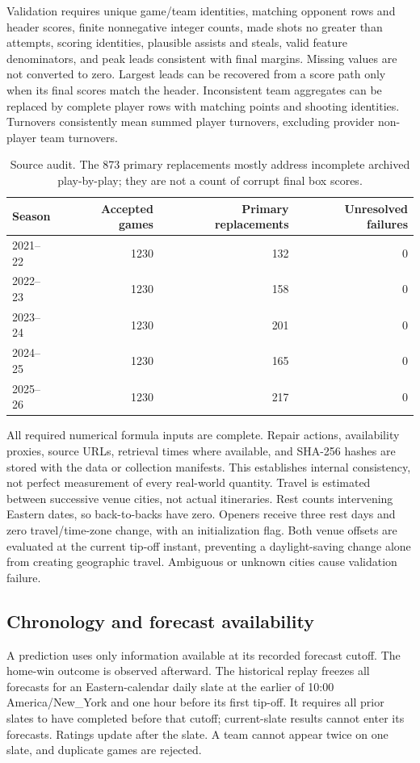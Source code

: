 \documentclass[11pt]{article}
\begin{document}
Validation requires unique game/team identities, matching opponent rows and
header scores, finite nonnegative integer counts, made shots no greater than
attempts, scoring identities, plausible assists and steals, valid feature
denominators, and peak leads consistent with final margins. Missing values
are not converted to zero. Largest leads can be recovered from a score path
only when its final scores match the header. Inconsistent team aggregates
can be replaced by complete player rows with matching points and shooting
identities. Turnovers consistently mean summed player turnovers, excluding
provider non-player team turnovers. 

\begin{table}[ht]
\centering\small
\begin{tabular}{lrrr}
\toprule
Season & Accepted games & Primary replacements & Unresolved failures\\
\midrule
2021--22 & 1230 & 132 & 0\\
2022--23 & 1230 & 158 & 0\\
2023--24 & 1230 & 201 & 0\\
2024--25 & 1230 & 165 & 0\\
2025--26 & 1230 & 217 & 0\\
\bottomrule
\end{tabular}
\caption{Source audit. The 873 primary replacements mostly address incomplete
archived play-by-play; they are not a count of corrupt final box scores.}
\end{table}

All required numerical formula inputs are complete. Repair actions, availability
proxies, source URLs, retrieval times where available, and SHA-256 hashes are
stored with the data or collection manifests. This establishes internal
consistency, not perfect measurement of every real-world quantity. Travel is
estimated between successive venue cities, not actual itineraries. Rest counts
intervening Eastern dates, so back-to-backs have zero. Openers receive three
rest days and zero travel/time-zone change, with an initialization flag.
Both venue offsets are evaluated at the current tip-off instant, preventing
a daylight-saving change alone from creating geographic travel. Ambiguous
or unknown cities cause validation failure.

\subsection{Chronology and forecast availability}
A prediction uses only information available at its recorded forecast cutoff.
The home-win outcome is observed afterward.
The historical replay freezes all forecasts for an Eastern-calendar daily
slate at the earlier of 10:00 America/New\_York and one hour before its first
tip-off. It requires all prior slates to have completed before that cutoff;
current-slate results cannot enter its forecasts. Ratings update after the
slate. A team cannot appear twice on one slate, and duplicate games are rejected.
\end{document}
